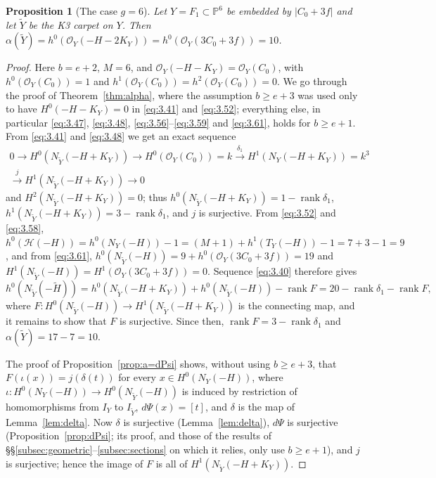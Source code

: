 \documentclass[11pt,reqno]{amsart}
\theoremstyle{plain}
\newtheorem{proposition}[theorem]{Proposition}
\theoremstyle{definition}
\newcommand{\PP}{\mathbb{P}}
\newcommand{\OO}{\mathcal{O}}
\newcommand{\Yt}{\widetilde{Y}}
\newcommand{\Ht}{\widetilde{H}}
\newcommand{\NY}{N_{Y}}
\newcommand{\NYt}{N_{\Yt}}
\newcommand{\Hc}{\mathcal{H}}
\begin{document}
\begin{proposition}[The case $g=6$]\label{prop:g6}
Let $Y=F_1\subset\PP^6$ be embedded by $|C_0+3f|$ and let $\Yt$ be the K3 carpet on $Y$. Then $\alpha(\Yt)=h^0(\OO_Y(-H-2K_Y))=h^0(\OO_Y(3C_0+3f))=10$.
\end{proposition}

\begin{proof}
Here $b=e+2$, $M=6$, and $\OO_Y(-H-K_Y)=\OO_Y(C_0)$, with $h^0(\OO_Y(C_0))=1$ and $h^1(\OO_Y(C_0))=h^2(\OO_Y(C_0))=0$. We go through the proof of Theorem~\ref{thm:alpha}, where the assumption $b\ge e+3$ was used only to have $H^0(-H-K_Y)=0$ in \eqref{eq:3.41} and \eqref{eq:3.52}; everything else, in particular \eqref{eq:3.47}, \eqref{eq:3.48}, \eqref{eq:3.56}--\eqref{eq:3.59} and \eqref{eq:3.61}, holds for $b\ge e+1$. From \eqref{eq:3.41} and \eqref{eq:3.48} we get an exact sequence
\begin{multline*}
0\to H^0(\NYt(-H+K_Y))\to H^0(\OO_Y(C_0))=k\xrightarrow{\ \delta_1\ }H^1(\NY(-H+K_Y))=k^3\\
\xrightarrow{\ j\ }H^1(\NYt(-H+K_Y))\to0
\end{multline*}
and $H^2(\NYt(-H+K_Y))=0$; thus $h^0(\NYt(-H+K_Y))=1-\operatorname{rank}\delta_1$, $h^1(\NYt(-H+K_Y))=3-\operatorname{rank}\delta_1$, and $j$ is surjective. From \eqref{eq:3.52} and \eqref{eq:3.58}, $h^0(\Hc(-H))=h^0(\NY(-H))-1=(M+1)+h^1(T_Y(-H))-1=7+3-1=9$, and from \eqref{eq:3.61}, $h^0(\NYt(-H))=9+h^0(\OO_Y(3C_0+3f))=19$ and $H^1(\NYt(-H))=H^1(\OO_Y(3C_0+3f))=0$. Sequence \eqref{eq:3.40} therefore gives
\[
h^0(\NYt(-\Ht))=h^0(\NYt(-H+K_Y))+h^0(\NYt(-H))-\operatorname{rank}F=20-\operatorname{rank}\delta_1-\operatorname{rank}F,
\]
where $F\colon H^0(\NYt(-H))\to H^1(\NYt(-H+K_Y))$ is the connecting map, and it remains to show that $F$ is surjective. Since then, $\operatorname{rank}F=3-\operatorname{rank}\delta_1$ and $\alpha(\Yt)=17-7=10$.

The proof of Proposition~\ref{prop:a=dPsi} shows, without using $b\ge e+3$, that $F(\iota(x))=j(\delta(t))$ for every $x\in H^0(\NY(-H))$, where $\iota\colon H^0(\NY(-H))\to H^0(\NYt(-H))$ is induced by restriction of homomorphisms from $I_Y$ to $I_{\Yt}$, $d\Psi(x)=[t]$, and $\delta$ is the map of Lemma~\ref{lem:delta}. Now $\delta$ is surjective (Lemma~\ref{lem:delta}), $d\Psi$ is surjective (Proposition~\ref{prop:dPsi}; its proof, and those of the results of \S\S\ref{subsec:geometric}--\ref{subsec:sections} on which it relies, only use $b\ge e+1$), and $j$ is surjective; hence the image of $F$ is all of $H^1(\NYt(-H+K_Y))$.
\end{proof}
\end{document}
